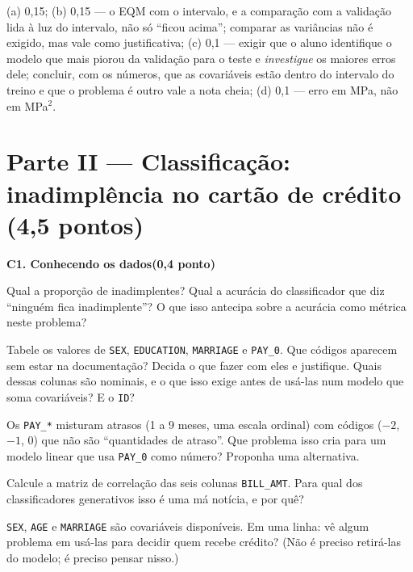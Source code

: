 \documentclass[11pt,a4paper]{article}
\newcommand{\tarefa}[3]{%
  \bigskip\par\noindent
  {\large\bfseries\color{azulufrj}#1. #2}\hfill{\bfseries(#3)}\par
  \nopagebreak\vspace{0.3em}}
\newcommand{\cod}[1]{\texttt{#1}}
\begin{document}
\begin{criterio}
(a) 0,15; (b) 0,15 --- o EQM com o intervalo, e a comparação com a validação lida
à luz do intervalo, não só ``ficou acima''; comparar as variâncias não é exigido, mas
vale como justificativa; (c) 0,1 ---
exigir que o aluno identifique o modelo que mais piorou da validação para o teste e
\emph{investigue} os maiores erros dele; concluir, com os números, que as covariáveis
estão dentro do intervalo do treino e que o problema é outro vale a nota cheia;
(d) 0,1 --- erro em MPa, não em MPa$^2$.
\end{criterio}

\section{Parte II --- Classificação: inadimplência no cartão de crédito \hfill (4,5 pontos)}

\tarefa{C1}{Conhecendo os dados}{0,4 ponto}

\begin{itens}
  \item Qual a proporção de inadimplentes? Qual a acurácia do classificador que diz
        ``ninguém fica inadimplente''? O que isso antecipa sobre a acurácia como
        métrica neste problema?
  \item Tabele os valores de \cod{SEX}, \cod{EDUCATION}, \cod{MARRIAGE} e
        \cod{PAY\_0}. Que códigos aparecem sem estar na documentação? Decida o que
        fazer com eles e justifique. Quais dessas colunas são nominais, e o que isso
        exige antes de usá-las num modelo que soma covariáveis? E o \cod{ID}?
  \item Os \cod{PAY\_*} misturam atrasos (1 a 9 meses, uma escala ordinal) com
        códigos ($-2$, $-1$, $0$) que não são ``quantidades de atraso''. Que problema
        isso cria para um modelo linear que usa \cod{PAY\_0} como número? Proponha
        uma alternativa.
  \item Calcule a matriz de correlação das seis colunas \cod{BILL\_AMT}. Para qual
        dos classificadores generativos isso é uma má notícia, e por quê?
  \item \cod{SEX}, \cod{AGE} e \cod{MARRIAGE} são covariáveis disponíveis. Em uma
        linha: vê algum problema em usá-las para decidir quem recebe crédito?
        (Não é preciso retirá-las do modelo; é preciso pensar nisso.)
\end{itens}
\end{document}
